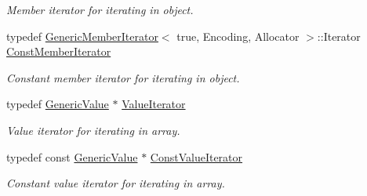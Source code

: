 \begin{DoxyCompactItemize}
\begin{DoxyCompactList}\small\item\em Member iterator for iterating in object. \end{DoxyCompactList}\item 
\hypertarget{class_generic_value_aac08c3e660a9036d3dcb8b10ff6c61f4}{}typedef \hyperlink{class_generic_member_iterator}{Generic\+Member\+Iterator}$<$ true, Encoding, Allocator $>$\+::Iterator \hyperlink{class_generic_value_aac08c3e660a9036d3dcb8b10ff6c61f4}{Const\+Member\+Iterator}\label{class_generic_value_aac08c3e660a9036d3dcb8b10ff6c61f4}

\begin{DoxyCompactList}\small\item\em Constant member iterator for iterating in object. \end{DoxyCompactList}\item 
\hypertarget{class_generic_value_aee30721a49688ba0f865f5d581eb6be9}{}typedef \hyperlink{class_generic_value}{Generic\+Value} $\ast$ \hyperlink{class_generic_value_aee30721a49688ba0f865f5d581eb6be9}{Value\+Iterator}\label{class_generic_value_aee30721a49688ba0f865f5d581eb6be9}

\begin{DoxyCompactList}\small\item\em Value iterator for iterating in array. \end{DoxyCompactList}\item 
\hypertarget{class_generic_value_a49010c6d6886f96ff0b0c51bccc7f6ea}{}typedef const \hyperlink{class_generic_value}{Generic\+Value} $\ast$ \hyperlink{class_generic_value_a49010c6d6886f96ff0b0c51bccc7f6ea}{Const\+Value\+Iterator}\label{class_generic_value_a49010c6d6886f96ff0b0c51bccc7f6ea}

\begin{DoxyCompactList}\small\item\em Constant value iterator for iterating in array. \end{DoxyCompactList}\end{DoxyCompactItemize}
